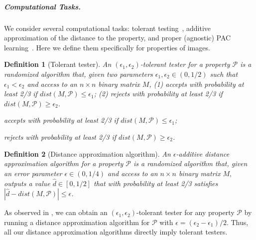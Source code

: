 \documentclass[11pt,english]{article}
\renewenvironment{enumerate}[1]{\begin{compactenum}#1}{\end{compactenum}}
\newtheorem{definition}{Definition}[section]
\numberwithin{figure}{section}
\newcommand{\cP}{{\mathcal P}}
\newcommand{\eps}{{\epsilon}}
\newcommand{\dis}{dist}
\newcommand{\mydelta}{\epsilon} \newcommand{\bigdelta}{{\epsilon_0}} \newcommand{\dsquares}{d_{\rm squares}}
\newcommand{\dout}{\hat{d}}
\begin{document}
\subparagraph{Computational Tasks.}
We consider several computational tasks: tolerant testing~\cite{PRR06}, additive approximation of the distance to the property, and proper (agnostic) PAC learning~\cite{Valiant84,KearnsSS94,Haussler92}.
\ifnum{}
Here we define them specifically for properties of images.
\fi
\begin{definition}[Tolerant tester]\label{def:tester}
 An {\em $(\eps_1,\eps_2)$-tolerant tester} for a property $\cP$ is a randomized algorithm that, given two parameters $\eps_1,\eps_2\in(0,1/2)$ such that $\eps_1<\eps_2$ and access to an $n\times n$ binary matrix $M$,
\ifnum{}
(1) accepts with probability at least 2/3 if $\dis(M,\cP)\leq\eps_1$;
(2) rejects with probability at least 2/3 if $\dis(M,\cP)\geq\eps_2$.
\else
\begin{enumerate}
\item accepts with probability at least 2/3 if $\dis(M,\cP)\leq\eps_1$;
\item rejects with probability at least 2/3 if $\dis(M,\cP)\geq\eps_2$.
\end{enumerate}
\fi

\end{definition}



\begin{definition}[Distance approximation algorithm]\label{def:distance-approx-alg}
An {\em $\mydelta$-additive distance approximation algorithm} for a property $\cP$ is a randomized algorithm that, given an error parameter $\mydelta\in(0,1/4)$ and access to an $n\times n$ binary matrix $M,$ outputs a value $\dout\in[0,1/2]$ that with probability at least 2/3 satisfies $|\dout -\dis(M,\cP)|\leq \mydelta$.
\end{definition}

As observed in \cite{PRR06}, we can obtain an $(\eps_1,\eps_2)$-tolerant tester for any property $\cP$ by running a distance approximation algorithm for $\cP$ with $\mydelta=(\eps_2-\eps_1)/2$. Thus, all our distance approximation algorithms directly imply tolerant testers.
\end{document}
